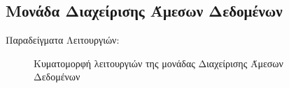 \documentclass[11pt]{extarticle}
\begin{document}
\subsection{Μονάδα Διαχείρισης Άμεσων Δεδομένων}
Παραδείγματα Λειτουργιών:
\begin{figure}[H]
\centering
\renewcommand{\figurename}{Κυματομορφή} 
\caption[Κυματομορφή - Μονάδα Διαχείρισης Άμεσων Δεδομένων]{Κυματομορφή λειτουργιών της μονάδας Διαχείρισης Άμεσων Δεδομένων}
\end{figure}
\end{document}
